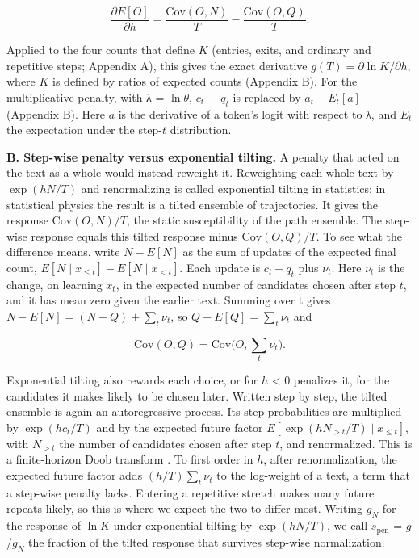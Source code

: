 \documentclass[aps,prx,onecolumn,superscriptaddress,longbibliography]{revtex4-2}
\begin{document}
\begin{equation}\frac{\partial E[O]}{\partial h}=\frac{\mathrm{Cov}(O,N)}{T}-\frac{\mathrm{Cov}(O,Q)}{T}.\end{equation}

Applied to the four counts that define \(K\) (entries, exits, and ordinary and repetitive steps; Appendix A), this gives the exact derivative \(g(T)=\partial\ln K/\partial h\), where \(K\) is defined by ratios of expected counts (Appendix B). For the multiplicative penalty, with λ = \(\ln \theta\), \(c_{t}\) − \(q_{t}\) is replaced by \(a_t-E_t[a]\) (Appendix B). Here \(a\) is the derivative of a token's logit with respect to λ, and \(E_{t}\) the expectation under the step-\(t\) distribution.

\textbf{B. Step-wise penalty versus exponential tilting.} A penalty that acted on the text as a whole would instead reweight it. Reweighting each whole text by \(\exp(hN/T)\) and renormalizing is called exponential tilting in statistics; in statistical physics the result is a tilted ensemble of trajectories. It gives the response \(\mathrm{Cov}(O,N)/T\), the static susceptibility of the path ensemble. The step-wise response equals this tilted response minus \(\mathrm{Cov}(O,Q)/T\). To see what the difference means, write \(N-E[N]\) as the sum of updates of the expected final count, \(E[N\mid x_{\le t}]-E[N\mid x_{<t}]\). Each update is \(c_t-q_t\) plus \(\nu_t\). Here \(\nu_{t}\) is the change, on learning \(x_{t}\), in the expected number of candidates chosen after step \(t\), and it has mean zero given the earlier text. Summing over t gives \(N-E[N]=(N-Q)+\sum_t \nu_t\), so \(Q-E[Q]=\sum_t \nu_t\) and

\begin{equation}\mathrm{Cov}(O,Q)=\mathrm{Cov}\Big(O,\sum_t \nu_t\Big).\end{equation}

Exponential tilting also rewards each choice, or for \(h\) \textless{} 0 penalizes it, for the candidates it makes likely to be chosen later. Written step by step, the tilted ensemble is again an autoregressive process. Its step probabilities are multiplied by \(\exp(hc_t/T)\) and by the expected future factor \(E[\exp(hN_{>t}/T)\mid x_{\le t}]\), with \(N_{>t}\) the number of candidates chosen after step \(t\), and renormalized. This is a finite-horizon Doob transform \cite{JackSollich2010,ChetriteTouchette2015}. To first order in \(h\), after renormalization, the expected future factor adds \((h/T)\sum_t \nu_t\) to the log-weight of a text, a term that a step-wise penalty lacks. Entering a repetitive stretch makes many future repeats likely, so this is where we expect the two to differ most. Writing \(g_{N}\) for the response of \(\ln K\) under exponential tilting by \(\exp(hN/T)\), we call \(s_{\mathrm{pen}}\) = \(g\)/\(g_{N}\) the fraction of the tilted response that survives step-wise normalization.
\end{document}
